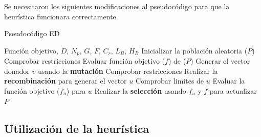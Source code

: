 \documentclass[10pt,a4paper]{article}
\begin{document}
Se necesitaron los siguientes modificaciones al pseudocódigo para que la heurística funcionara correctamente.

\begin{algorithm}
\caption{Pseudocódigo ED}
\begin{algorithmic}[1]
\REQUIRE Función objetivo, $D$, $N_{p}$, $G$, $F$, $C_{r}$, $L_{B}$, $H_{B}$ 
	\STATE Inicializar la población aleatoria ($P$)
	\STATE Comprobar restricciones 
\ENDWHILE
\STATE Evaluar función objetivo ($f$) de ($P$)
			\STATE Generar el vector donador $v$ usando la \textbf{mutación}
			\STATE Comprobar restricciones 
		\ENDWHILE
	\STATE Realizar la \textbf{recombinación} para generar el vector $u$
	\ENDFOR
		\STATE Comprobar limites de $u$
		\STATE Evaluar la función objetivo ($f_{u}$) para $u$ 
		\STATE Realizar la \textbf{selección} usando $f_{u}$ y $f$ para actualizar $P$
	\ENDFOR
\ENDFOR
\end{algorithmic}
\end{algorithm}


\subsection{Utilización de la heurística}
\end{document}
